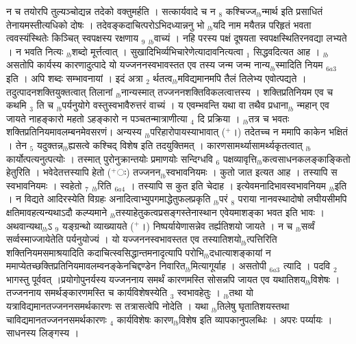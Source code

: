 \documentclass[article,12pt,a4paper]{memoir}%
\newcommand{\add}[1]{($^{+}$#1)}
\begin{document}
	  
	  \pstart \leavevmode%
	न च तयोरपि तुल्यञ्चोद्यन्न तदेको वक्तुमर्हति । सत्कार्यवादे च न {\tiny $_{8}$} कश्चिज्ज{\tiny $_{lb}$}न्मार्थ इति प्रसाधितं तेनायमस्तीत्यधिको दोषः । तदेवङ्कदाचित्परोऽभिदध्यान्ननु भो {\tiny $_{lb}$}यदि नाम मयैतन्न परिहृतं भवता त्ववस्यंस्थितेः किञ्चित् स्वपक्षस्य रक्षणाय {\tiny $_{9}$} \leavevmode{} {\tiny $_{lb}$}वाच्यं । नहि परस्य पक्षं दूषयता स्वपक्षस्थितिरनवद्या लभ्यते । न भवति नित्यः {\tiny $_{lb}$}शब्दो मूर्त्तत्वात् । सुखादिभिर्व्यभिचारेणेत्यादावनित्यत्वा {\tiny $_{1}$} सिद्धवदित्यत आह । {\tiny $_{lb}$} {\color{DodgerBlue3}असतोपि कार्यस्य कारणादुत्पादे यो यज्जननस्वभावस्तत एव तस्य जन्म जन्म नान्य{\tiny $_{lb}$}स्मादिति नियम} {\tiny $_{6a3}$} इति । अपि शब्दः सम्भावनायां । इदं अत्रा {\tiny $_{2}$} र्थतत्व{\tiny $_{lb}$}मविद्यमानमपि तैलं तिलेभ्य एवोत्पद्यते । तदुत्पादनशक्तियुक्तत्वात् तिलानां {\tiny $_{lb}$}नान्यस्मात् तज्जननशक्तिविकलत्वात्तस्य । शक्तिप्रतिनियम एव च कथमि {\tiny $_{3}$} ति च {\tiny $_{lb}$}पर्यनुयोगे वस्तुस्वभावैरुत्तरं वाच्यं । य एवम्भवन्ति यथा वा तथैव प्रधाना{\tiny $_{lb}$} \leavevmode{} न्महान् एव जायते नाहङ्कारो महतो ऽहङ्कारो न पञ्चतन्मात्राणीत्या {\tiny $_{4}$} दि प्रक्रिया । {\tiny $_{lb}$}तत्र च भवतः शक्तिप्रतिनियमावलम्बनमेवसरणं। अन्यस्य {\tiny $_{lb}$}परिहारोपायस्याभावात् \add{।} तदेतच्च न ममापि काकेन भक्षितं । तेन {\tiny $_{5}$} यदुक्तन्न{\tiny $_{lb}$}ह्यसत्वे कश्चिद् विशेष इति तदयुक्तिमत् । कारणसामर्थ्यासामर्थ्यकृतत्वात् {\tiny $_{lb}$}कार्योत्पत्यनुत्पत्योः । तस्मात् पुरोनुक्रान्तयोः प्रमाणयोः सन्दिग्धवि {\tiny $_{6}$} पक्षव्यावृत्ति{\tiny $_{lb}$}कत्वसाधनकलङ्काङ्कितो हेतुरिति । भवेदेतत्तस्यापि हेतो \add{ः} तज्जनन{\tiny $_{lb}$}स्वभावनियमः । कुतो जात इत्यत आह । {\color{DodgerBlue3}तस्यापि स स्वभावनियमः । स्वहेतो {\tiny $_{7}$}} {\tiny $_{lb}$}रिति {\tiny $_{6a4}$} । तस्यापि स कुत इति चेदाह । इत्येवमनादिभावस्वभावनियम {\tiny $_{lb}$}इति । न विद्यते आदिरस्येति विग्रहः अनादित्वाभ्युपगमाद्धेतुफलप्रकृति {\tiny $_{lb}$}परं {\tiny $_{8}$} पराया नानवस्थादोषो लघीयसीमपि क्षतिमावहत्यन्यथाऽदौ कल्प्यमाने {\tiny $_{lb}$}तस्याहेतुकत्वप्रसङ्गस्तेनास्थान एवेयमाशङ्का भवत इति भावः । अथवान्यथा{\tiny $_{lb}$}ऽ {\tiny $_{9}$} \leavevmode{} यङ्ग्रन्थो व्याख्यायते \add{।} निष्पर्यायेणासन्नेव तर्ह्यतिशयो जायते । न च {\tiny $_{lb}$}सर्व्वं सर्व्वस्माज्जायेतेति पर्यनुयोज्यं । यो यज्जननस्वभावस्तत एव तस्यातिशयो{\tiny $_{lb}$}त्पत्तिरिति शक्तिनियमसमाश्रयादिति कदाचित्स्वसिद्धान्तमनादृत्यापि परोभि{\tiny $_{lb}$}दधात्याशङ्कायां न ममाप्येतच्छक्तिप्रतिनियमावलम्वनङ्केनचिद्दण्डेन निवारित{\tiny $_{lb}$}मित्यागूर्याह । {\color{DodgerBlue3}असतोपी} {\tiny $_{6a3}$} त्यादि । पदवि {\tiny $_{2}$} भागस्तु पूर्ववत् ।प्रयोगोपुनर्यस्य यज्जननाय समर्थं कारणमस्ति सोसन्नपि जायत एव यथातिशय{\tiny $_{lb}$}विशेषः । तज्जननाय समर्थङ्कारणमस्ति च कार्यविशेषस्येति {\tiny $_{3}$} स्वभावहेतुः । {\tiny $_{lb}$}तथा यो यत्राविद्यमानतज्जननसमर्थकारणः स तत्रासत्वेपि नोदेति । यथा {\tiny $_{lb}$}तिलेषु घृतातिशयस्तथा चाविद्यमानतज्जननसमर्थकारणः {\tiny $_{4}$} कार्यविशेषः कारण{\tiny $_{lb}$}विशेष इति व्यापकानुपलब्धिः । अपरः पर्य्यायः । साधनस्य लिङ्गस्य ।
\end{document}
